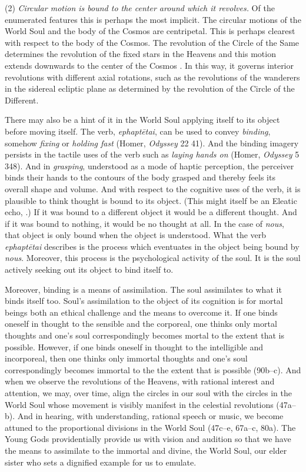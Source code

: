 (2) \emph{Circular motion is bound to the center around which it revolves.} Of the enumerated features this is perhaps the most implicit. The circular motions of the World Soul and the body of the Cosmos are centripetal. This is perhaps clearest with respect to the body of the Cosmos. The revolution of the Circle of the Same determines the revolution of the fixed stars in the Heavens and this motion extends downwards to the center of the Cosmos \citep[32]{Vlastos:1975aa}. In this way, it governs interior revolutions with different axial rotations, such as the revolutions of the wanderers in the sidereal ecliptic plane as determined by the revolution of the Circle of the Different.

There may also be a hint of it in the World Soul applying itself to its object before moving itself. The verb, \emph{ephaptētai}, can be used to convey \emph{binding}, somehow \emph{fixing} or \emph{holding fast} (Homer, \emph{Odyssey} 22 41). And the binding imagery persists in the tactile uses of the verb such as \emph{laying hands on} (Homer, \emph{Odyssey} 5 348). And in \emph{grasping}, understood as a mode of haptic perception, the perceiver binds their hands to the contours of the body grasped and thereby feels its overall shape and volume. And with respect to the cognitive uses of the verb, it is plausible to think thought is bound to its object. (This might itself be an Eleatic echo, \citealt[192]{Mourelatos:2008ve}.) If it was bound to a different object it would be a different thought. And if it was bound to nothing, it would be no thought at all. In the case of \emph{nous}, that object is only bound when the object is understood. What the verb \emph{ephaptētai} describes is the process which eventuates in the object being bound by \emph{nous}. Moreover, this process is the psychological activity of the soul. It is the soul actively seeking out its object to bind itself to. 

Moreover, binding is a means of assimilation. The soul assimilates to what it binds itself too. Soul's assimilation to the object of its cognition is for mortal beings both an ethical challenge and the means to overcome it. If one binds oneself in thought to the sensible and the corporeal, one thinks only mortal thoughts and one's soul correspondingly becomes mortal to the extent that is possible. However, if one binds oneself in thought to the intelligible and incorporeal, then one thinks only immortal thoughts and one's soul correspondingly becomes immortal to the the extent that is possible (90b--c). And when we observe the revolutions of the Heavens, with rational interest and attention, we may, over time, align the circles in our soul with the circles in the World Soul whose movement is visibly manifest in the celestial revolutions (47a--b). And in hearing, with understanding, rational speech or music, we become attuned to the proportional divisions in the World Soul (47c--e, 67a--c, 80a). The Young Gods providentially provide us with vision and audition so that we have the means to assimilate to the immortal and divine, the World Soul, our elder sister who sets a dignified example for us to emulate.


